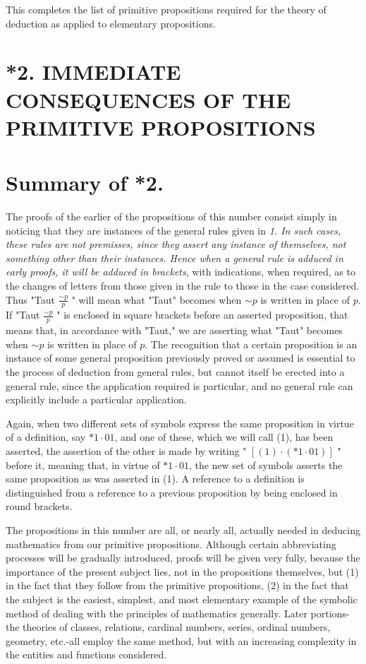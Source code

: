 \documentclass[10pt]{article}
\begin{document}
This completes the list of primitive propositions required for the theory of deduction as applied to elementary propositions.

\section*{*2. IMMEDIATE CONSEQUENCES OF THE PRIMITIVE PROPOSITIONS}
\section*{Summary of *2.}
The proofs of the earlier of the propositions of this number consist simply in noticing that they are instances of the general rules given in \textit{1. In such cases, these rules are not premisses, since they assert any instance of themselves, not something other than their instances. Hence when a general rule is adduced in early proofs, it will be adduced in brackets}, with indications, when required, as to the changes of letters from those given in the rule to those in the case considered. Thus "Taut $\frac{\sim p}{p}$ " will mean what "Taut" becomes when $\sim p$ is written in place of $p$. If "Taut $\frac{\sim p}{p}$ " is enclosed in square brackets before an asserted proposition, that means that, in accordance with "Taut," we are asserting what "Taut" becomes when $\sim p$ is written in place of $p$. The recognition that a certain proposition is an instance of some general proposition previously proved or assumed is essential to the process of deduction from general rules, but cannot itself be erected into a general rule, since the application required is particular, and no general rule can explicitly include a particular application.

Again, when two different sets of symbols express the same proposition in virtue of a definition, say $* 1 \cdot 01$, and one of these, which we will call (1), has been asserted, the assertion of the other is made by writing " $[(1) \cdot(* 1 \cdot 01)]$ " before it, meaning that, in virtue of $* 1 \cdot 01$, the new set of symbols asserts the same proposition as was asserted in (1). A reference to a definition is distinguished from a reference to a previous proposition by being enclosed in round brackets.

The propositions in this number are all, or nearly all, actually needed in deducing mathematics from our primitive propositions. Although certain abbreviating processes will be gradually introduced, proofs will be given very fully, because the importance of the present subject lies, not in the propositions themselves, but (1) in the fact that they follow from the primitive propositions, (2) in the fact that the subject is the easiest, simplest, and most elementary example of the symbolic method of dealing with the principles of mathematics generally. Later portions-the theories of classes, relations, cardinal numbers, series, ordinal numbers, geometry, etc.-all employ the same method, but with an increasing complexity in the entities and functions considered.
\end{document}
